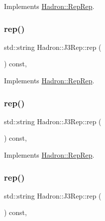 Implements \mbox{\hyperlink{structHadron_1_1RepRep_ab3213025f6de249f7095892109575fde}{Hadron\+::\+Rep\+Rep}}.

\mbox{\label{structHadron_1_1J3Rep_ab890e5844d6c221d555b2049711e89a6}} 
\subsubsection{\texorpdfstring{rep()}{rep()}\hspace{0.1cm}{\footnotesize\ttfamily [2/5]}}
{\footnotesize\ttfamily std\+::string Hadron\+::\+J3\+Rep\+::rep (\begin{DoxyParamCaption}{ }\end{DoxyParamCaption}) const\hspace{0.3cm}{\ttfamily [inline]}, {\ttfamily [virtual]}}



Implements \mbox{\hyperlink{structHadron_1_1RepRep_ab3213025f6de249f7095892109575fde}{Hadron\+::\+Rep\+Rep}}.

\mbox{\label{structHadron_1_1J3Rep_ab890e5844d6c221d555b2049711e89a6}} 
\subsubsection{\texorpdfstring{rep()}{rep()}\hspace{0.1cm}{\footnotesize\ttfamily [3/5]}}
{\footnotesize\ttfamily std\+::string Hadron\+::\+J3\+Rep\+::rep (\begin{DoxyParamCaption}{ }\end{DoxyParamCaption}) const\hspace{0.3cm}{\ttfamily [inline]}, {\ttfamily [virtual]}}



Implements \mbox{\hyperlink{structHadron_1_1RepRep_ab3213025f6de249f7095892109575fde}{Hadron\+::\+Rep\+Rep}}.

\mbox{\label{structHadron_1_1J3Rep_ab890e5844d6c221d555b2049711e89a6}} 
\subsubsection{\texorpdfstring{rep()}{rep()}\hspace{0.1cm}{\footnotesize\ttfamily [4/5]}}
{\footnotesize\ttfamily std\+::string Hadron\+::\+J3\+Rep\+::rep (\begin{DoxyParamCaption}{ }\end{DoxyParamCaption}) const\hspace{0.3cm}{\ttfamily [inline]}, {\ttfamily [virtual]}}



